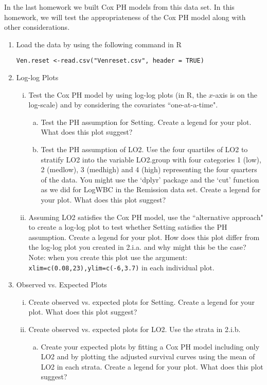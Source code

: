 \documentclass[12pt]{article}
\begin{document}
In the last homework we built Cox PH models from this data set. In this homework, we will test the appropriateness of the Cox PH model along with other considerations.
\begin{enumerate}[1.]
\item Load the data by using the following command in R

 \lstinline{Ven.reset <-read.csv("Venreset.csv", header = TRUE)}

\item Log-log Plots
\begin{enumerate}[i.]
\item Test the Cox PH model by using log-log plots (in R, the $x$-axis is on the log-scale) and by considering the covariates ``one-at-a-time".
\begin{enumerate}[a.]
\item Test the PH assumption for Setting. Create a legend for your plot. What does this plot suggest?
\item Test the PH assumption of LO2. Use the four quartiles of LO2 to stratify LO2 into the variable LO2.group with four categories 1 (low), 2 (medlow), 3 (medhigh) and 4 (high) representing the four quarters of the data. You might use the `dplyr' package and the `cut' function as we did for LogWBC in the Remission data set. Create a legend for your plot.  What does this plot suggest?
\end{enumerate}
\item Assuming LO2 satisfies the Cox PH model, use the ``alternative approach" to create a log-log plot to test whether Setting satisfies the PH assumption. Create a legend for your plot. How does this plot differ from the log-log plot you created in 2.i.a. and why might this be the case? Note: when you create this plot use the argument: \lstinline{xlim=c(0.08,23),ylim=c(-6,3.7)} in each individual plot.
\end{enumerate}
\item Observed vs. Expected Plots
\begin{enumerate}[i.]
\item Create observed vs. expected plots for Setting. Create a legend for your plot. What does this plot suggest?
\item Create observed vs. expected plots for LO2. Use the strata in 2.i.b.
\begin{enumerate}[a.]
\item Create your expected plots by fitting a Cox PH model including only LO2 and by plotting the adjusted survival curves using the mean of LO2 in each strata. Create a legend for your plot. What does this plot suggest?

\end{enumerate}
\end{enumerate}
\end{enumerate}
\end{document}
